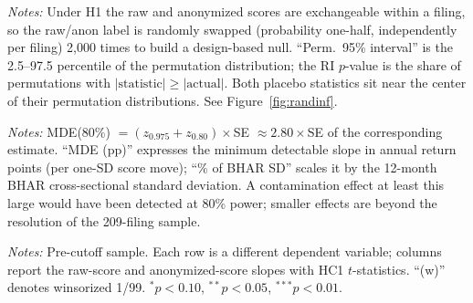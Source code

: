 \documentclass[12pt]{article}
\begin{document}
\begin{table}[htbp]\centering
\begin{threeparttable}
\caption{Randomization inference (2{,}000 within-filing raw/anon label swaps)}
\label{tab:ri}\small

\begin{tablenotes}\small\item \textit{Notes:} Under H1 the raw and anonymized scores are
exchangeable within a filing, so the raw/anon label is randomly swapped (probability
one-half, independently per filing) 2{,}000 times to build a design-based null. ``Perm.\ 95\%
interval'' is the 2.5--97.5 percentile of the permutation distribution; the RI $p$-value is
the share of permutations with $|\text{statistic}|\geq|\text{actual}|$. Both placebo
statistics sit near the center of their permutation distributions. See
Figure~\ref{fig:randinf}.
\end{tablenotes}
\end{threeparttable}
\end{table}

\begin{table}[htbp]\centering
\begin{threeparttable}
\caption{Minimum detectable effects at 80\% power}\label{tab:power}\small

\begin{tablenotes}\small\item \textit{Notes:} MDE(80\%) $=(z_{0.975}+z_{0.80})\times$SE
$\approx 2.80\times$SE of the corresponding estimate. ``MDE (pp)'' expresses the minimum
detectable slope in annual return points (per one-SD score move); ``\% of BHAR SD'' scales it
by the 12-month BHAR cross-sectional standard deviation. A contamination effect at least this
large would have been detected at 80\% power; smaller effects are beyond the resolution of the
209-filing sample.
\end{tablenotes}
\end{threeparttable}
\end{table}

\begin{table}[htbp]\centering
\begin{threeparttable}
\caption{Robustness: alternative outcome horizons (pre-cutoff)}\label{tab:robust}\small

\begin{tablenotes}\small\item \textit{Notes:} Pre-cutoff sample. Each row is a different
dependent variable; columns report the raw-score and anonymized-score slopes with HC1
$t$-statistics. ``(w)'' denotes winsorized 1/99. $^{*}p<0.10$, $^{**}p<0.05$, $^{***}p<0.01$.
\end{tablenotes}
\end{threeparttable}
\end{table}
\end{document}
